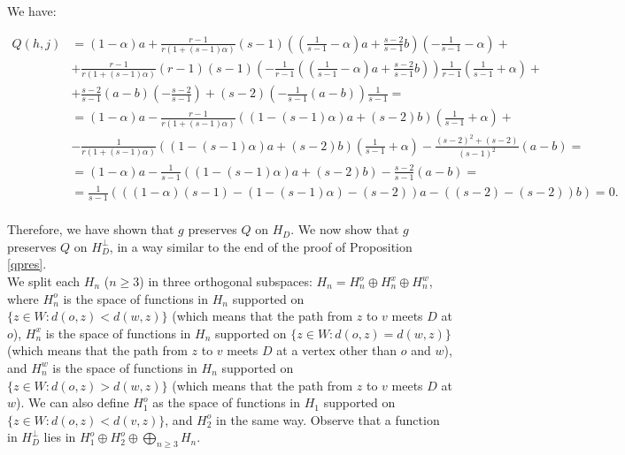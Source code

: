 \documentclass{article}
\theoremstyle{definition}
\theoremstyle{remark}
\theoremstyle{plain}
\begin{document}
We have:

\begin{align*}
Q(h,j)&=(1-\alpha)a+\frac{r-1}{r(1+(s-1)\alpha)}(s-1)\left(\left(\frac{1}{s-1}-\alpha\right)a+\frac{s-2}{s-1}b\right)\left(-\frac{1}{s-1}-\alpha\right)+ \\
&+\frac{r-1}{r(1+(s-1)\alpha)}(r-1)(s-1)\left(-\frac{1}{r-1}\left(\left(\frac{1}{s-1}-\alpha\right)a+\frac{s-2}{s-1}b\right)\right)\frac{1}{r-1}\left(\frac{1}{s-1}+\alpha\right)+ \\
&+\frac{s-2}{s-1}(a-b)\left(-\frac{s-2}{s-1}\right)+(s-2)\left(-\frac{1}{s-1}(a-b)\right)\frac{1}{s-1}= \\[1em]
&=(1-\alpha)a-\frac{r-1}{r(1+(s-1)\alpha)}\left(\left(1-(s-1)\alpha\right)a+(s-2)b\right)\left(\frac{1}{s-1}+\alpha\right)+ \\
&-\frac{1}{r(1+(s-1)\alpha)}\left(\left(1-(s-1)\alpha\right)a+(s-2)b\right)\left(\frac{1}{s-1}+\alpha\right)-\frac{(s-2)^2+(s-2)}{(s-1)^2}(a-b)= \\[1em]
&=(1-\alpha)a-\frac{1}{s-1}\left(\left(1-(s-1)\alpha\right)a+(s-2)b\right)-\frac{s-2}{s-1}(a-b)= \\[1em]
&=\frac{1}{s-1}(((1-\alpha)(s-1)-(1-(s-1)\alpha)-(s-2))a-((s-2)-(s-2))b)=0. \\
\end{align*}

Therefore, we have shown that $g$ preserves $Q$ on $H_D$. We now show that $g$ preserves $Q$ on $H_D^\perp$, in a way similar to the end of the proof of Proposition \ref{qpres}. \\

We split each $H_n$ ($n\geq 3$) in three orthogonal subspaces: $H_n=H_n^o\oplus H_n^x\oplus H_n^w$, where $H_n^o$ is the space of functions in $H_n$ supported on $\{z\in W: d(o,z)<d(w,z)\}$ (which means that the path from $z$ to $v$ meets $D$ at $o$), $H_n^x$ is the space of functions in $H_n$ supported on $\{z\in W: d(o,z)=d(w,z)\}$ (which means that the path from $z$ to $v$ meets $D$ at a vertex other than $o$ and $w$), and $H_n^w$ is the space of functions in $H_n$ supported on $\{z\in W: d(o,z)>d(w,z)\}$ (which means that the path from $z$ to $v$ meets $D$ at $w$). We can also define $H_1^o$ as the space of functions in $H_1$ supported on $\{z\in W: d(o,z)<d(v,z)\}$, and $H_2^o$ in the same way. Observe that a function in $H_D^\perp$ lies in $H_1^o\oplus H_2^o\oplus\bigoplus_{n\geq 3}{H_n}$. \\
\end{document}
